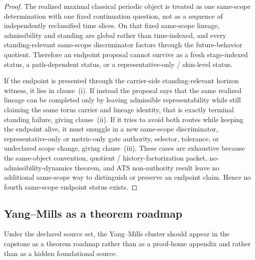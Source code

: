 \begin{proof}
The realized maximal classical periodic object is treated as one same-scope determination with one fixed continuation question, not as a sequence of independently reclassified time slices. On that fixed same-scope lineage, admissibility and standing are global rather than time-indexed, and every standing-relevant same-scope discriminator factors through the future-behavior quotient. Therefore an endpoint proposal cannot survive as a fresh stage-indexed status, a path-dependent status, or a representative-only / skin-level status.

If the endpoint is presented through the carrier-side standing-relevant horizon witness, it lies in clause~(i). If instead the proposal says that the same realized lineage can be completed only by leaving admissible representability while still claiming the same torus carrier and lineage identity, that is exactly terminal standing failure, giving clause~(ii). If it tries to avoid both routes while keeping the endpoint alive, it must smuggle in a new same-scope discriminator, representative-only or metric-only gate authority, selector, tolerance, or undeclared scope change, giving clause~(iii). These cases are exhaustive because the same-object convention, quotient / history-factorization packet, no-admissibility-dynamics theorem, and ATS non-authority result leave no additional same-scope way to distinguish or preserve an endpoint claim. Hence no fourth same-scope endpoint status exists.\cite{MaleyCarrierNS}
\end{proof}

\subsection{Yang--Mills as a theorem roadmap}

\begin{proposition}
Under the declared source set, the Yang--Mills cluster should appear in the capstone as a theorem roadmap rather than as a proof-home appendix and rather than as a hidden foundational source.
\end{proposition}

